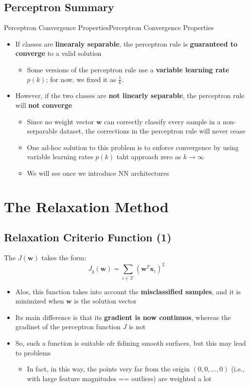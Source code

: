 \documentclass[a4paper]{article}
\theoremstyle{definition}
\begin{document}
\subsection{Perceptron Summary}
\begin{definition}{Perceptron Convergence Properties}{Perceptron Convergence Properties}
\begin{itemize}
    \item If classes are \textbf{linearaly separable}, the perceptron rule is \textbf{guaranteed to converge} to a valid solution 
    \begin{itemize}
        \item Some versions of the perceptron rule use a \textbf{variable learning rate} \( p(k) \); for now, we fixed it as \( \frac{1}{k} \).
    \end{itemize}
    \item However, if the two classes are \textbf{not linearly separable}, the perceptron rule will \textbf{not converge}
    \begin{itemize}
        \item Since no weight vector \( \mathbf{w} \) can correctly classify every sample in a non-serparable 
            dataset, the corrections in the perceptron rule will never cease 
        \item One ad-hoc solution to this problem is to enforce convergence by using variable learning rates \( p(k) \) taht approach zero as \( k \to \infty \)   
        \item We will see once we introduce NN architectures
    \end{itemize}
\end{itemize}
\end{definition}
\section{The Relaxation Method}
\subsection{Relaxation Criterio Function (1)}
The \( J(\mathbf{w}) \) takes the form:
\[
  J_q(\mathbf{w}) = \sum_{i \in \mathcal{X}}(\mathbf{w}^T \mathbf{x}_i)^2
\]
\begin{itemize}
    \item Alos, this function takes into account the \textbf{misclassified samples}, and it is minimized when \( \mathbf{w} \) is the solution vector 
    \item Its main difference is that its \textbf{gradient is now continuos}, whereas the gradinet of the perceptron function \( J \) is not 
    \item So, such a function is suitable ofr fidining smooth surfaces, but this may lead to problems
    \begin{itemize}
        \item In fact, in this way, the points very far from the origin \( (0,0,\ldots,0) \) (i.e., with large feature magnitudes == outliers) are weighted a lot
    \end{itemize}
\end{itemize}
\end{document}
